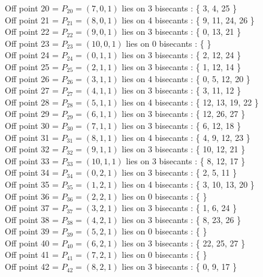 \documentclass{article}
\begin{document}
{Off point 20 = $P_{20} = ( 7, 0, 1 )$ lies on 3 bisecants : \{ 3, 4, 25 \}\\
Off point 21 = $P_{21} = ( 8, 0, 1 )$ lies on 4 bisecants : \{ 9, 11, 24, 26 \}\\
Off point 22 = $P_{22} = ( 9, 0, 1 )$ lies on 3 bisecants : \{ 0, 13, 21 \}\\
Off point 23 = $P_{23} = ( 10, 0, 1 )$ lies on 0 bisecants : \{  \}\\
Off point 24 = $P_{24} = ( 0, 1, 1 )$ lies on 3 bisecants : \{ 2, 12, 24 \}\\
Off point 25 = $P_{25} = ( 2, 1, 1 )$ lies on 3 bisecants : \{ 1, 12, 14 \}\\
Off point 26 = $P_{26} = ( 3, 1, 1 )$ lies on 4 bisecants : \{ 0, 5, 12, 20 \}\\
Off point 27 = $P_{27} = ( 4, 1, 1 )$ lies on 3 bisecants : \{ 3, 11, 12 \}\\
Off point 28 = $P_{28} = ( 5, 1, 1 )$ lies on 4 bisecants : \{ 12, 13, 19, 22 \}\\
Off point 29 = $P_{29} = ( 6, 1, 1 )$ lies on 3 bisecants : \{ 12, 26, 27 \}\\
Off point 30 = $P_{30} = ( 7, 1, 1 )$ lies on 3 bisecants : \{ 6, 12, 18 \}\\
Off point 31 = $P_{31} = ( 8, 1, 1 )$ lies on 4 bisecants : \{ 4, 9, 12, 23 \}\\
Off point 32 = $P_{32} = ( 9, 1, 1 )$ lies on 3 bisecants : \{ 10, 12, 21 \}\\
Off point 33 = $P_{33} = ( 10, 1, 1 )$ lies on 3 bisecants : \{ 8, 12, 17 \}\\
Off point 34 = $P_{34} = ( 0, 2, 1 )$ lies on 3 bisecants : \{ 2, 5, 11 \}\\
Off point 35 = $P_{35} = ( 1, 2, 1 )$ lies on 4 bisecants : \{ 3, 10, 13, 20 \}\\
Off point 36 = $P_{36} = ( 2, 2, 1 )$ lies on 0 bisecants : \{  \}\\
Off point 37 = $P_{37} = ( 3, 2, 1 )$ lies on 3 bisecants : \{ 1, 6, 24 \}\\
Off point 38 = $P_{38} = ( 4, 2, 1 )$ lies on 3 bisecants : \{ 8, 23, 26 \}\\
Off point 39 = $P_{39} = ( 5, 2, 1 )$ lies on 0 bisecants : \{  \}\\
Off point 40 = $P_{40} = ( 6, 2, 1 )$ lies on 3 bisecants : \{ 22, 25, 27 \}\\
Off point 41 = $P_{41} = ( 7, 2, 1 )$ lies on 0 bisecants : \{  \}\\
Off point 42 = $P_{42} = ( 8, 2, 1 )$ lies on 3 bisecants : \{ 0, 9, 17 \}\\
}
\end{document}
